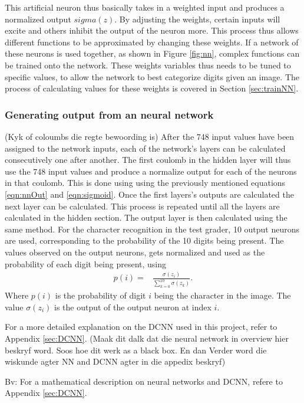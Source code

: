 This artificial neuron thus basically takes in a weighted input and produces a normalized output $sigma(z)$. By adjusting the weights, certain inputs will excite and others inhibit the output of the neuron more. This process thus allows different functions to be approximated by changing these weights. If a network of these neurons is used together, as shown in Figure \ref{fig:nn}, complex functions can be trained onto the network. These weights variables thus needs to be tuned to specific values, to allow the network to best categorize digits given an image. The process of calculating values for these weights is covered in Section \ref{sec:trainNN}.

\subsubsection{Generating output from an neural network}
(Kyk of coloumbs die regte bewoording is)
After the 748 input values have been assigned to the network inputs, each of the network's layers can be calculated consecutively one after another. The first coulomb in the hidden layer will thus use the 748 input values and produce a normalize output for each of the neurons in that coulomb. This is done using using the previously mentioned equations \ref{eqn:nnOut} and \ref{eqn:sigmoid}. Once the first layers's outputs are calculated the next layer can be calculated. This process is repeated until all the layers are calculated in the hidden section. The output layer is then calculated using the same method. For the character recognition in the test grader, 10 output neurons are used, corresponding to the probability of the 10 digits being present. The values observed on the output neurons, gets normalized and used as the probability of each digit being present, using
\begin{align}
  p(i) =  &\displaystyle{\frac{\sigma(z_{i})}{\sum_{k=0}^{10} \sigma(z_{k})}}.
\label{eqn:normal}
\end{align}
Where $p(i)$ is the probability of digit $i$ being the character in the image. The value $\sigma(z_{i})$ is the output of the output neuron at index $i$.

For a more detailed explanation on the DCNN used in this project, refer to Appendix \ref{sec:DCNN}. (Maak dit dalk dat die neural network in overview hier beskryf word. Soos hoe dit werk as a black box. En dan Verder word die wiskunde agter NN and DCNN agter in die appedix beskryf)

Bv: For a mathematical description on neural networks and DCNN, refere to Appendix \ref{sec:DCNN}.

